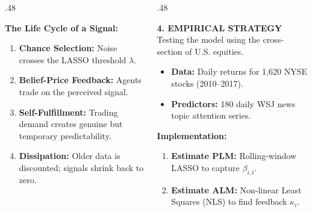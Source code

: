 \documentclass[final]{beamer}
\begin{document}
\begin{frame}[t, plain]
\begin{columns}[t]
\begin{column}{.48\textwidth}
\begin{center}
\begin{tcolorbox}[basebox]
                    \vspace{0.3cm}
                    \textbf{The Life Cycle of a Signal:}
                    \begin{enumerate}
                        \item \textbf{Chance Selection:} Noise crosses the LASSO threshold $\lambda$.
                        \item \textbf{Belief-Price Feedback:} Agents trade on the perceived signal.
                        \item \textbf{Self-Fulfillment:} Trading demand creates genuine but temporary predictability.
                        \item \textbf{Dissipation:} Older data is discounted; signals shrink back to zero.
                    \end{enumerate}
                \end{tcolorbox}

            \end{center}
        \end{column}

        \begin{column}{.48\textwidth}
            \begin{center}

                \begin{tcolorbox}[basebox]
                    {\color{blue900}\Large\textbf{4. EMPIRICAL STRATEGY}} \vspace{0.5cm}
                    Testing the model using the cross-section of U.S. equities.
                    \begin{itemize}
                        \item \textbf{Data:} Daily returns for 1,620 NYSE stocks (2010--2017).
                        \item \textbf{Predictors:} 180 daily WSJ news topic attention series.
                    \end{itemize}
                    \vspace{0.3cm}
                    \textbf{Implementation:}
                    \begin{enumerate}
                        \item \textbf{Estimate PLM:} Rolling-window LASSO to capture $\beta_{i,t}$.
                        \item \textbf{Estimate ALM:} Non-linear Least Squares (NLS) to find feedback $\kappa_i$.
                    \end{enumerate}
                \end{tcolorbox}


\end{center}
\end{column}
\end{columns}
\end{frame}
\end{document}
